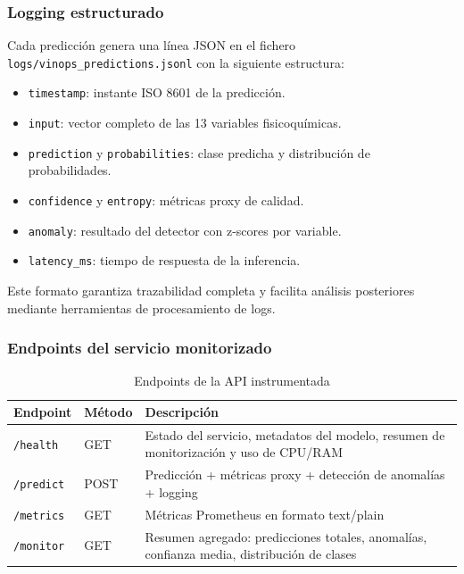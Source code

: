 \subsubsection{Logging estructurado}

Cada predicción genera una línea JSON en el fichero \texttt{logs/vinops\_predictions.jsonl} con la siguiente estructura:

\begin{itemize}
    \item \texttt{timestamp}: instante ISO 8601 de la predicción.
    \item \texttt{input}: vector completo de las 13 variables fisicoquímicas.
    \item \texttt{prediction} y \texttt{probabilities}: clase predicha y distribución de probabilidades.
    \item \texttt{confidence} y \texttt{entropy}: métricas proxy de calidad.
    \item \texttt{anomaly}: resultado del detector con z-scores por variable.
    \item \texttt{latency\_ms}: tiempo de respuesta de la inferencia.
\end{itemize}

Este formato garantiza trazabilidad completa y facilita análisis posteriores mediante herramientas de procesamiento de logs.

\subsubsection{Endpoints del servicio monitorizado}

\begin{table}[htbp]
\centering
\caption{Endpoints de la API instrumentada}
\label{tab:endpoints}
\begin{tabular}{@{}llp{7cm}@{}}
\toprule
\textbf{Endpoint} & \textbf{Método} & \textbf{Descripción} \\
\midrule
\texttt{/health} & GET & Estado del servicio, metadatos del modelo, resumen de monitorización y uso de CPU/RAM \\
\texttt{/predict} & POST & Predicción + métricas proxy + detección de anomalías + logging \\
\texttt{/metrics} & GET & Métricas Prometheus en formato text/plain \\
\texttt{/monitor} & GET & Resumen agregado: predicciones totales, anomalías, confianza media, distribución de clases \\
\bottomrule
\end{tabular}
\end{table}

